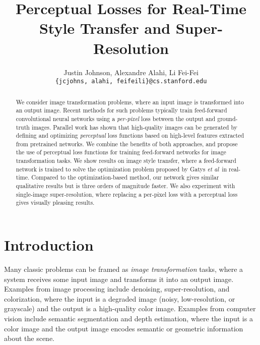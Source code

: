 \documentclass[runningheads]{llncs}
\newcommand{\etal}{\textit{et al}}
\begin{document}
\pagestyle{headings}
\mainmatter
\def\ECCV16SubNumber{442}  

\title{Perceptual Losses for Real-Time Style Transfer and Super-Resolution}


\authorrunning{Johnson \etal}

\author{Justin Johnson, Alexandre Alahi, Li Fei-Fei \\
  {\tt\small\{jcjohns, alahi, feifeili\}@cs.stanford.edu}}


\maketitle

\begin{abstract}
We consider image transformation problems, where an input image is transformed into an
output image. Recent methods for such problems typically train feed-forward convolutional
neural networks using a \emph{per-pixel} loss between the output and ground-truth images.
Parallel work has shown that high-quality images can be generated by defining and optimizing
\emph{perceptual} loss functions based on high-level features extracted from pretrained
networks. We combine the benefits of both approaches, and propose the use of perceptual
loss functions for training feed-forward networks for image transformation tasks. We show
results on image
style transfer, where a feed-forward network is trained to solve the optimization
problem proposed by Gatys \etal~in real-time. Compared to the optimization-based method, our
network gives similar qualitative results but is three orders of magnitude faster.
We also experiment with single-image super-resolution, where replacing
a per-pixel loss with a perceptual loss gives visually pleasing results.
\end{abstract}


\section{Introduction}
Many classic problems can be framed as \emph{image transformation} tasks, where a system
receives some input image and transforms it into an output image. Examples from image
processing include denoising, super-resolution, and
colorization, where the input is a degraded image (noisy, low-resolution, or grayscale)
and the output is a high-quality color image. Examples from computer vision
include semantic segmentation and depth estimation, where the input is a color
image and the output image encodes semantic or geometric information about the scene.
\end{document}
